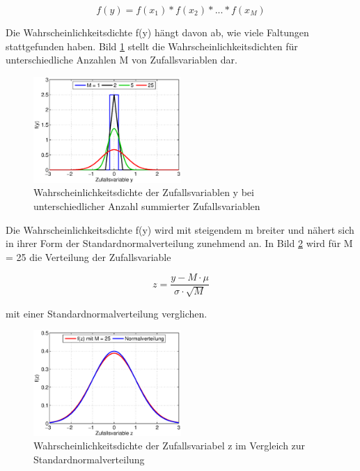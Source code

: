 \begin{equation}\label{eq:eightsixtysix}
f(y)=f(x_{1})*f(x_{2})*...*f(x_{M})
\end{equation}

\noindent Die Wahrscheinlichkeitsdichte f(y) h\"{a}ngt davon ab, wie viele Faltungen stattgefunden haben. Bild \ref{fig:Grenzwertsatz1} stellt die Wahrscheinlichkeitsdichten f\"{u}r unterschiedliche Anzahlen M von Zufallsvariablen dar.

\noindent 
\begin{figure}[H]
  \centerline{\includegraphics[width=0.5\textwidth]{Kapitel8/Bilder/image6}}
  \caption{Wahrscheinlichkeitsdichte der Zufallsvariablen y bei unterschiedlicher Anzahl summierter Zufallsvariablen}
  \label{fig:Grenzwertsatz1}
\end{figure}

\noindent Die Wahrscheinlichkeitsdichte f(y) wird mit steigendem m breiter und n\"{a}hert sich in ihrer Form der Standardnormalverteilung zunehmend an. In Bild \ref{fig:Grenzwertsatz2} wird f\"{u}r M = 25 die Verteilung der Zufallsvariable 

\begin{equation}\label{eq:eightsixtyseven}
z=\dfrac{y-M\cdot \mu}{\sigma \cdot \sqrt{M}}
\end{equation}

\noindent mit einer Standardnormalverteilung verglichen.

\noindent 
\begin{figure}[H]
  \centerline{\includegraphics[width=0.5\textwidth]{Kapitel8/Bilder/image7}}
  \caption{Wahrscheinlichkeitsdichte der Zufallsvariabel z im Vergleich zur Standardnormalverteilung}
  \label{fig:Grenzwertsatz2}
\end{figure}

